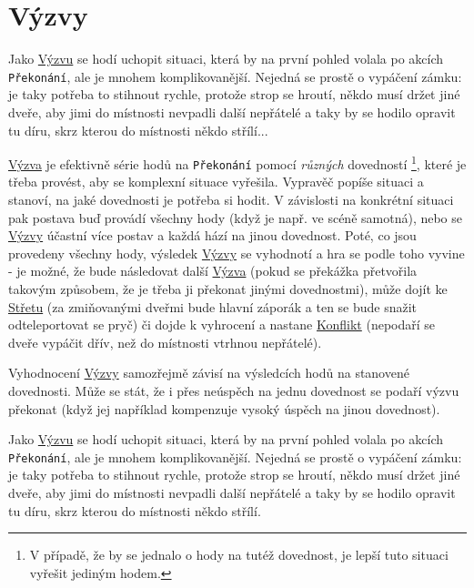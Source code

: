 \documentclass[../main.tex]{subfiles}
\begin{document}
\section{Výzvy}
\label{sec:vyzvy}

Jako \underline{Výzvu} se hodí uchopit situaci, která by na první pohled volala po akcích \texttt{Překonání}, ale je mnohem komplikovanější. Nejedná se prostě o vypáčení zámku: je taky potřeba to stihnout rychle, protože strop se hroutí, někdo musí držet jiné dveře, aby jimi do místnosti nevpadli další nepřátelé a taky by se hodilo opravit tu díru, skrz kterou do místnosti někdo střílí...

\underline{Výzva} je efektivně série hodů na \texttt{Překonání} pomocí \textit{různých} dovedností \footnote{V případě, že by se jednalo o hody na tutéž dovednost, je lepší tuto situaci vyřešit jediným hodem.}, které je třeba provést, aby se komplexní situace vyřešila. Vypravěč popíše situaci a stanoví, na jaké dovednosti je potřeba si hodit. V závislosti na konkrétní situaci pak postava buď provádí všechny hody (když je např. ve scéně samotná), nebo se \underline{Výzvy} účastní více postav a každá hází na jinou dovednost. Poté, co jsou provedeny všechny hody, výsledek \underline{Výzvy} se vyhodnotí a hra se podle toho vyvine - je možné, že bude následovat další \underline{Výzva} (pokud se překážka přetvořila takovým způsobem, že je třeba ji překonat jinými dovednostmi), může dojít ke \underline{Střetu} (za zmiňovanými dveřmi bude hlavní záporák a ten se bude snažit odteleportovat se pryč) či dojde k vyhrocení a nastane \underline{Konflikt} (nepodaří se dveře vypáčit dřív, než do místnosti vtrhnou nepřátelé).

Vyhodnocení \underline{Výzvy} samozřejmě závisí na výsledcích hodů na stanovené dovednosti. Může se stát, že i přes neúspěch na jednu dovednost se podaří výzvu překonat (když jej například kompenzuje vysoký úspěch na jinou dovednost).

Jako \underline{Výzvu} se hodí uchopit situaci, která by na první pohled volala po akcích \texttt{Překonání}, ale je mnohem komplikovanější. Nejedná se prostě o vypáčení zámku: je taky potřeba to stihnout rychle, protože strop se hroutí, někdo musí držet jiné dveře, aby jimi do místnosti nevpadli další nepřátelé a taky by se hodilo opravit tu díru, skrz kterou do místnosti někdo střílí.
\end{document}

